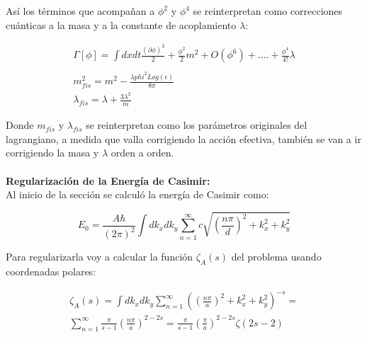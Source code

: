 Así los términos que acompañan a $\phi ^2 $ y $\phi ^4 $ se reinterpretan como correcciones cuánticas a la masa y a la constante de acoplamiento $\lambda $:

\begin{equation}
\begin{array}{c}

\Gamma [ \phi ] = 
\int dx dt 
\frac{ ( \partial \phi ) ^2 }{2 } +
\frac{\phi ^2}{2} m ^2 + O ( \phi ^6 ) + .... 
+ \frac{\phi ^4}{4!} \lambda \\ \\
m ^2 _{fis} = m ^2 - \frac{\lambda phi ^2 Log( \epsilon )}{8 \pi} \\
\lambda _{fis} = \lambda + \frac{3 \lambda ^2}{m} 


\end{array}
\end{equation}

Donde $m _{fis}$ y $ \lambda _{fis} $ se reinterpretan como los parámetros originales del lagrangiano, a medida que valla corrigiendo la acción efectiva, también se van a ir corrigiendo la masa y $\lambda $ orden a orden. \\ \\

\textbf{Regularización de la Energía de Casimir:}\\

Al inicio de la sección se calculó la energía de Casimir como:

\begin{equation}
E _0 = \frac{A \hbar }{(2 \pi) ^2} \int dk _x dk _y 
\sum _{n=1} ^{\infty} 
c
\sqrt{
		\left( \frac{n \pi}{d} \right) ^2 + k _x ^2 + k _y ^2
		}
\end{equation}

Para regularizarla voy a calcular la función $\zeta _A (s)$ del problema usando coordenadas polares:

\begin{equation}
\begin{array}{c}

\zeta _A (s) = 
\int dk _x dk _y 
\sum _{n=1} ^{\infty} 
\left(	\left( \frac{n \pi}{a } \right) ^2 + k _x ^2 + k _y ^2
		\right) ^{-s} = \\[10pt]
\sum _{n=1} ^{\infty}  \frac{\pi}{s-1} \left( \frac{n \pi}{a} \right) ^{2-2s} =
\frac{\pi}{s-1} \left( \frac{\pi}{a} \right) ^{2-2s} \zeta (2s-2) 

\end{array}
\end{equation}

